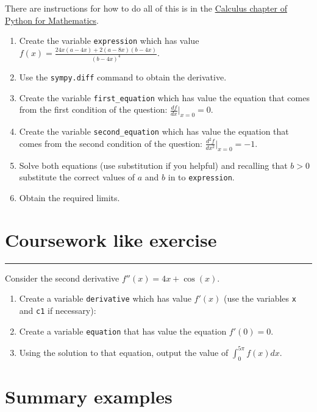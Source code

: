 \documentclass{article}
\begin{document}
There are instructions for how to do all of this is in the
\href{https://vknight.org/pfm/tools-for-mathematics/03-calculus/how/}{Calculus chapter of Python for Mathematics}.


\begin{enumerate}
\item
  Create the variable \texttt{expression} which has value
        $f(x)= \frac{24 x \left(a - 4 x\right) + 2 \left(a - 8 x\right) \left(b - 4 x\right)}{\left(b - 4 x\right)^{4}}$.
\item Use the \texttt{sympy.diff} command to obtain the
        derivative.
\item Create the variable \texttt{first_equation} which has value the
    equation that comes from the first condition of the question:
        $\frac{df}{dx}|_{x=0} = 0$.
\item Create the variable \texttt{second_equation} which has value the
    equation that comes from the second condition of the question:
        $\frac{d^2f}{dx^2}|_{x=0} = -1$.
    \item Solve both equations (use substitution if you helpful) and recalling
        that $b>0$ substitute the correct values of $a$ and $b$ in to
        \texttt{expression}.
    \item Obtain the required limits.
\end{enumerate}


\section{Coursework like exercise}
\hrule


Consider the second derivative $f''(x)=4 x + \cos(x)$.

\begin{enumerate}
    \item Create a variable \texttt{derivative} which has value 
        $f'(x)$ (use the variables \texttt{x} and
        \texttt{c1} if necessary):
    \item Create a variable \texttt{equation} that has value the 
        equation $f'(0)=0$.
    \item Using the solution to that equation, output the value of $\int_{0}^{5\pi}f(x)dx$.
\end{enumerate}

\section{Summary examples}
\end{document}
